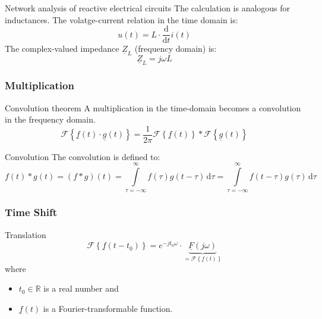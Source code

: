 \begin{refsection}
\begin{excursus}{Network analysis of reactive electrical circuits}
	The calculation is analogous for inductances. The volatge-current relation in the time domain is:
	\begin{equation}
		u(t) = L \cdot \frac{\mathrm{d}}{\mathrm{d} t} i(t)
	\end{equation}
	The complex-valued impedance $\underline{Z}_L$ (frequency domain) is:
	\begin{equation}
		\underline{Z}_L = j \omega L
	\end{equation}
\end{excursus}

\subsubsection{Multiplication}

\begin{definition}{Convolution theorem}
	A multiplication in the time-domain becomes a convolution in the frequency domain.
	\begin{equation}
		\mathcal{F}\left\{ \underline{f}(t) \cdot \underline{g}(t) \right\} = \frac{1}{2 \pi} \mathcal{F}\left\{\underline{f}(t)\right\} * \mathcal{F}\left\{\underline{g}(t)\right\}
		\label{eq:ch02:op_mult}
	\end{equation}
\end{definition}

\begin{excursus}{Convolution}
	The convolution is defined to:
	\begin{equation}
		f(t) * g(t) = \left(f * g\right) (t) = \int\limits_{\tau = -\infty}^{\infty} f(\tau) g(t - \tau) \, \mathrm{d} \tau  = \int\limits_{\tau = -\infty}^{\infty} f(t - \tau) g(\tau) \, \mathrm{d} \tau
		\label{eq:ch02:def_convolution}
	\end{equation}
\end{excursus}

\subsubsection{Time Shift}


\begin{definition}{Translation}
	\begin{equation}
		\mathcal{F}\left\{\underline{f}(t - t_0)\right\} = e^{-j t_0 \omega} \cdot \underbrace{\underline{F} \left(j \omega\right)}_{= \mathcal{F}\left\{\underline{f}(t)\right\}}
		\label{eq:ch02:op_time_shift}
	\end{equation}
	where
	\begin{itemize}
		\item $t_0 \in \mathbb{R}$ is a real number and
		\item $\underline{f}(t)$ is a Fourier-transformable function.
	\end{itemize}
\end{definition}


\end{refsection}
